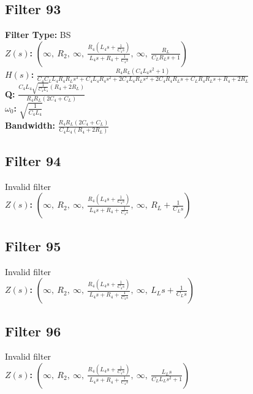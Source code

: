 \documentclass{article}
\begin{document}
\subsection*{Filter 93}
\textbf{Filter Type:} BS \\ 
\textbf{$Z(s)$:} $\left( \infty, \  R_{2}, \  \infty, \  \frac{R_{4} \left(L_{4} s + \frac{1}{C_{4} s}\right)}{L_{4} s + R_{4} + \frac{1}{C_{4} s}}, \  \infty, \  \frac{R_{L}}{C_{L} R_{L} s + 1}\right)$ \\ 
\textbf{$H(s)$:} $\frac{R_{4} R_{L} \left(C_{4} L_{4} s^{2} + 1\right)}{C_{4} C_{L} L_{4} R_{4} R_{L} s^{3} + C_{4} L_{4} R_{4} s^{2} + 2 C_{4} L_{4} R_{L} s^{2} + 2 C_{4} R_{4} R_{L} s + C_{L} R_{4} R_{L} s + R_{4} + 2 R_{L}}$ \\ 
\textbf{Q:} $\frac{C_{4} L_{4} \sqrt{\frac{1}{C_{4} L_{4}}} \left(R_{4} + 2 R_{L}\right)}{R_{4} R_{L} \left(2 C_{4} + C_{L}\right)}$ \\ 
\textbf{$\omega_0$:} $\sqrt{\frac{1}{C_{4} L_{4}}}$ \\ 
\textbf{Bandwidth:} $\frac{R_{4} R_{L} \left(2 C_{4} + C_{L}\right)}{C_{4} L_{4} \left(R_{4} + 2 R_{L}\right)}$ \\ 
\subsection*{Filter 94}
Invalid filter \\ 
\textbf{$Z(s)$:} $\left( \infty, \  R_{2}, \  \infty, \  \frac{R_{4} \left(L_{4} s + \frac{1}{C_{4} s}\right)}{L_{4} s + R_{4} + \frac{1}{C_{4} s}}, \  \infty, \  R_{L} + \frac{1}{C_{L} s}\right)$ \\ 
\subsection*{Filter 95}
Invalid filter \\ 
\textbf{$Z(s)$:} $\left( \infty, \  R_{2}, \  \infty, \  \frac{R_{4} \left(L_{4} s + \frac{1}{C_{4} s}\right)}{L_{4} s + R_{4} + \frac{1}{C_{4} s}}, \  \infty, \  L_{L} s + \frac{1}{C_{L} s}\right)$ \\ 
\subsection*{Filter 96}
Invalid filter \\ 
\textbf{$Z(s)$:} $\left( \infty, \  R_{2}, \  \infty, \  \frac{R_{4} \left(L_{4} s + \frac{1}{C_{4} s}\right)}{L_{4} s + R_{4} + \frac{1}{C_{4} s}}, \  \infty, \  \frac{L_{L} s}{C_{L} L_{L} s^{2} + 1}\right)$ \\ 
\end{document}
